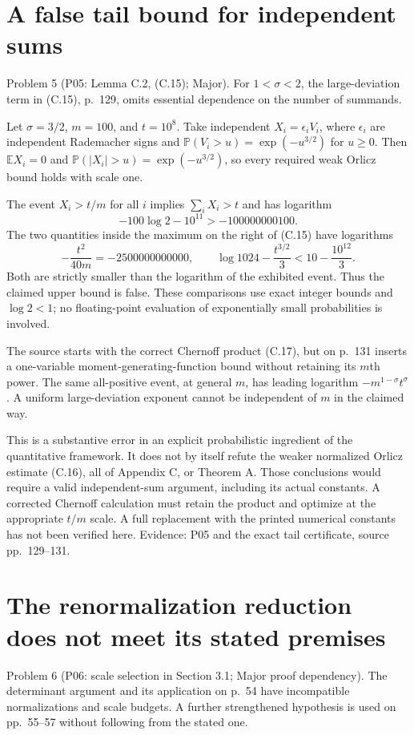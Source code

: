 \documentclass[10pt]{article}
\begin{document}
\section*{A false tail bound for independent sums}
Problem 5 (P05: Lemma C.2, (C.15); Major).  For \(1<\sigma<2\), the large-deviation term in (C.15), p. 129, omits essential dependence on the number of summands.\par
Let \(\sigma=3/2\), \(m=100\), and \(t=10^8\). Take independent \(X_i=\epsilon_iV_i\), where \(\epsilon_i\) are independent Rademacher signs and \(\mathbb P(V_i>u)=\exp(-u^{3/2})\) for \(u\ge0\). Then \(\mathbb EX_i=0\) and \(\mathbb P(|X_i|>u)=\exp(-u^{3/2})\), so every required weak Orlicz bound holds with scale one.\par
The event \(X_i>t/m\) for all \(i\) implies \(\sum_iX_i>t\) and has logarithm \[-100\log2-10^{11}>-100000000100.\] The two quantities inside the maximum on the right of (C.15) have logarithms \[-\frac{t^2}{40m}=-2500000000000,\qquad
 \log1024-\frac{t^{3/2}}3
 <10-\frac{10^{12}}3.\] Both are strictly smaller than the logarithm of the exhibited event. Thus the claimed upper bound is false. These comparisons use exact integer bounds and \(\log2<1\); no floating-point evaluation of exponentially small probabilities is involved.\par
The source starts with the correct Chernoff product (C.17), but on p. 131 inserts a one-variable moment-generating-function bound without retaining its \(m\)th power. The same all-positive event, at general \(m\), has leading logarithm \(-m^{1-\sigma}t^\sigma\). A uniform large-deviation exponent cannot be independent of \(m\) in the claimed way.\par
This is a substantive error in an explicit probabilistic ingredient of the quantitative framework. It does not by itself refute the weaker normalized Orlicz estimate (C.16), all of Appendix C, or Theorem A. Those conclusions would require a valid independent-sum argument, including its actual constants. A corrected Chernoff calculation must retain the product and optimize at the appropriate \(t/m\) scale. A full replacement with the printed numerical constants has not been verified here. Evidence: P05 and the exact tail certificate, source pp. 129–131.\par
\section*{The renormalization reduction does not meet its stated premises}
Problem 6 (P06: scale selection in Section 3.1; Major proof dependency).  The determinant argument and its application on p. 54 have incompatible normalizations and scale budgets. A further strengthened hypothesis is used on pp. 55–57 without following from the stated one.\par
\end{document}
